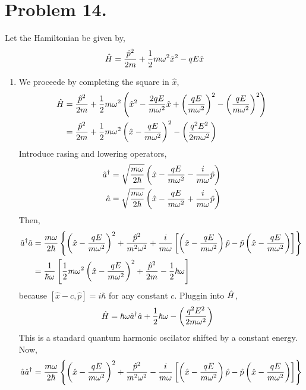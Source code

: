 \documentclass[12pt]{extarticle}
\begin{document}
\section*{Problem 14.}

Let the Hamiltonian be given by, \[\hat{H} = \frac{\hat{p}^2}{2m} + \frac{1}{2} m \omega^2 \hat{x}^2 - q E \hat{x}\]

\begin{enumerate}
\item We proceede by completing the square in $\hat{x}$,
\begin{align*}
\hat{H} &= \frac{\hat{p}^2}{2m} + \frac{1}{2} m \omega^2 \left( \hat{x}^2 - \frac{2 q E}{m \omega^2} \hat{x} + \left( \frac{q E}{m \omega^2} \right)^2 - \left( \frac{q E}{m \omega^2} \right)^2\right) \\ &=  \frac{\hat{p}^2}{2m} + \frac{1}{2} m \omega^2 \left( \hat{x} - \frac{q E}{m \omega^2} \right)^2 - \left( \frac{q^2 E^2}{2 m \omega^2} \right)
\end{align*}
Introduce rasing and lowering operators,
\begin{align*}
\hat{a}^\dagger &= \sqrt{\frac{m \omega}{2 \hbar}} \left(\hat{x} - \frac{qE}{m \omega^2} - \frac{i}{m \omega} \hat{p} \right) \\
\hat{a} &= \sqrt{\frac{m \omega}{2 \hbar}} \left(\hat{x} - \frac{qE}{m \omega^2} + \frac{i}{m \omega} \hat{p} \right)
\end{align*} 
Then,
\begin{align*}
\hat{a}^\dagger \hat{a} &= \frac{m \omega}{2 \hbar} \left\{ \left(\hat{x} - \frac{qE}{m \omega^2} \right)^2 + \frac{\hat{p}^2}{m^2 \omega^2} + \frac{i}{m \omega} \left[ \left(\hat{x} - \frac{qE}{m \omega^2} \right) \hat{p} - \hat{p} \left(\hat{x} - \frac{qE}{m \omega^2} \right) \right] \right\} \\
& =  \frac{1}{\hbar \omega} \left[ \frac{1}{2} m \omega^2 \left(\hat{x} - \frac{qE}{m \omega^2} \right)^2 + \frac{\hat{p}^2}{2 m} - \frac{1}{2} \hbar \omega \right]
\end{align*} 
because $[\hat{x} - c, \hat{p}] = i \hbar$ for any constant $c$. Pluggin into $\hat{H}$,
\begin{align*}
\hat{H} &= \hbar \omega \hat{a}^\dagger \hat{a} + \frac{1}{2} \hbar \omega - \left( \frac{q^2 E^2}{2 m \omega^2} \right)
\end{align*}
This is a standard quantum harmonic oscilator shifted by a constant energy. Now,
\begin{align*}
\a \adag &= \frac{m \omega}{2 \hbar} \left\{ \left(\hat{x} - \frac{qE}{m \omega^2} \right)^2 + \frac{\hat{p}^2}{m^2 \omega^2} - \frac{i}{m \omega} \left[ \left(\hat{x} - \frac{qE}{m \omega^2} \right) \hat{p} - \hat{p} \left(\hat{x} - \frac{qE}{m \omega^2} \right) \right] \right\} \\

\end{align*}
\end{enumerate}
\end{document}
